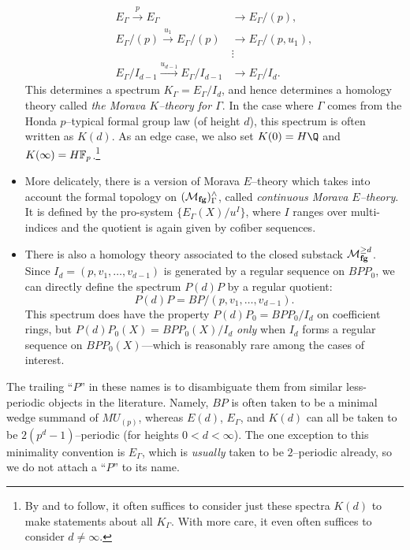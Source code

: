 \begin{definition}
\begin{itemize}
\begin{align*}
E_\Gamma \xrightarrow{p} E_\Gamma & \to E_\Gamma / (p), \\
E_\Gamma / (p) \xrightarrow{u_1} E_\Gamma / (p) & \to E_\Gamma / (p, u_1), \\
& \vdots \\
E_\Gamma / I_{d-1} \xrightarrow{u_{d-1}} E_\Gamma / I_{d-1} & \to E_\Gamma / I_d.
\end{align*}
This determines a spectrum $K_\Gamma = E_\Gamma / I_d$, and hence determines a homology theory called \textit{the Morava $K$--theory for $\Gamma$}.  In the case where $\Gamma$ comes from the Honda $p$--typical formal group law (of height $d$), this spectrum is often written as $K(d)$.  As an edge case, we also set $K(0) = H\Q$ and $K(\infty) = \HFp$.\footnote{By  and  to follow, it often suffices to consider just these spectra $K(d)$ to make statements about all $K_\Gamma$.  With more care, it even often suffices to consider $d \ne \infty$.}
\item More delicately, there is a version of Morava $E$--theory which takes into account the formal topology on $(\mathcal{M}_{\mathbf{fg}})^\wedge_\Gamma$, called \textit{continuous Morava $E$--theory}.  It is defined by the pro-system $\{E_\Gamma(X) / u^I\}$, where $I$ ranges over multi-indices and the quotient is again given by cofiber sequences.
\item There is also a homology theory associated to the closed substack $\mathcal{M}_{\mathbf{fg}}^{\ge d}$.  Since $I_d = (p, v_1, \ldots, v_{d-1})$ is generated by a regular sequence on $BPP_0$, we can directly define the spectrum $P(d)P$ by a regular quotient: \[P(d)P = BP / (p, v_1, \ldots, v_{d-1}).\]  This spectrum does have the property $P(d)P_0 = BPP_0 / I_d$ on coefficient rings, but $P(d)P_0(X) = BPP_0(X) / I_d$ \emph{only} when $I_d$ forms a regular sequence on $BPP_0(X)$---which is reasonably rare among the cases of interest.
\end{itemize}
\end{definition}

\begin{remark}
The trailing ``$P$'' in these names is to disambiguate them from similar less-periodic objects in the literature.  Namely, $BP$ is often taken to be a minimal wedge summand of $MU_{(p)}$, whereas $E(d)$, $E_\Gamma$, and $K(d)$ can all be taken to be $2(p^d-1)$--periodic (for heights $0 < d < \infty$).  The one exception to this minimality convention is $E_\Gamma$, which is \emph{usually} taken to be $2$--periodic already, so we do not attach a ``$P$'' to its name.
\end{remark}

